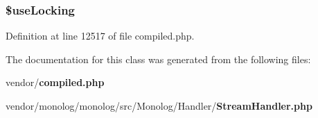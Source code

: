 \subsubsection[{\$use\+Locking}]{\setlength{\rightskip}{0pt plus 5cm}\$use\+Locking\hspace{0.3cm}{\ttfamily [protected]}}\label{class_monolog_1_1_handler_1_1_stream_handler_abedca205ed4f8dbc0e2a00307cc1df73}


Definition at line 12517 of file compiled.\+php.



The documentation for this class was generated from the following files\+:\begin{DoxyCompactItemize}
\item 
vendor/{\bf compiled.\+php}\item 
vendor/monolog/monolog/src/\+Monolog/\+Handler/{\bf Stream\+Handler.\+php}\end{DoxyCompactItemize}
